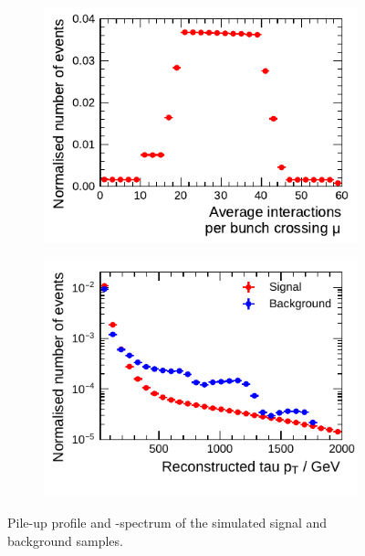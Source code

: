 \begin{figure}[htb]
  \centering
  \begin{subfigure}[t]{0.48\textwidth}
    \centering
    \includegraphics{./figures/bdt_perf/pt_mu_samples/mu.pdf}
  \end{subfigure}\hfill
  \begin{subfigure}[t]{0.48\textwidth}
    \centering
    \includegraphics{./figures/bdt_perf/pt_mu_samples/pt_fixed.pdf}
  \end{subfigure}
  \caption[Pile-up profile and \pt-spectrum of simulated signal and background
  samples]{Pile-up profile and \pt-spectrum of the simulated signal and
    background samples.}
  \label{fig:pt_mu}
\end{figure}

